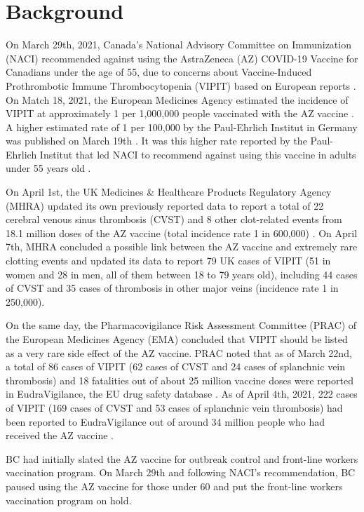 \documentclass[]{interact}
\theoremstyle{plain}%
\theoremstyle{definition}
\theoremstyle{remark}
\begin{document}
\hypertarget{background}{%
\section{Background}\label{background}}

On March 29th, 2021, Canada's National Advisory Committee on
Immunization (NACI) recommended against using the AstraZeneca (AZ)
COVID-19 Vaccine for Canadians under the age of 55, due to concerns
about Vaccine-Induced Prothrombotic Immune Thrombocytopenia (VIPIT)
based on European reports \citep{naci_naci_2021}. On Match 18, 2021, the
European Medicines Agency estimated the incidence of VIPIT at
approximately 1 per 1,000,000 people vaccinated with the AZ vaccine
\citep{ema_covid-19_2021}. A higher estimated rate of 1 per 100,000 by
the Paul-Ehrlich Institut in Germany was published on March 19th
\citep{pei_covid-19_2021}. It was this higher rate reported by the
Paul-Ehrlich Institut that led NACI to recommend against using this
vaccine in adults under 55 years old \citep{naci_naci_2021}.

On April 1st, the UK Medicines \& Healthcare Products Regulatory Agency
(MHRA) updated its own previously reported data to report a total of 22
cerebral venous sinus thrombosis (CVST) and 8 other clot-related events
from 18.1 million doses of the AZ vaccine (total incidence rate 1 in
600,000) \citep{mhra_coronavirus_2021}. On April 7th, MHRA concluded a
possible link between the AZ vaccine and extremely rare clotting events
and updated its data to report 79 UK cases of VIPIT (51 in women and 28
in men, all of them between 18 to 79 years old), including 44 cases of
CVST and 35 cases of thrombosis in other major veins (incidence rate 1
in 250,000)\citep{mhra_mhra_2021}.

On the same day, the Pharmacovigilance Risk Assessment Committee (PRAC)
of the European Medicines Agency (EMA) concluded that VIPIT should be
listed as a very rare side effect of the AZ vaccine. PRAC noted that as
of March 22nd, a total of 86 cases of VIPIT (62 cases of CVST and 24
cases of splanchnic vein thrombosis) and 18 fatalities out of about 25
million vaccine doses were reported in EudraVigilance, the EU drug
safety database \citep{ema_astrazenecas_2021}. As of April 4th, 2021,
222 cases of VIPIT (169 cases of CVST and 53 cases of splanchnic vein
thrombosis) had been reported to EudraVigilance out of around 34 million
people who had received the AZ vaccine \citep{ema_astrazenecas_2021}.

BC had initially slated the AZ vaccine for outbreak control and
front-line workers vaccination program. On March 29th and following
NACI's recommendation, BC paused using the AZ vaccine for those under 60
and put the front-line workers vaccination program on hold.
\end{document}
